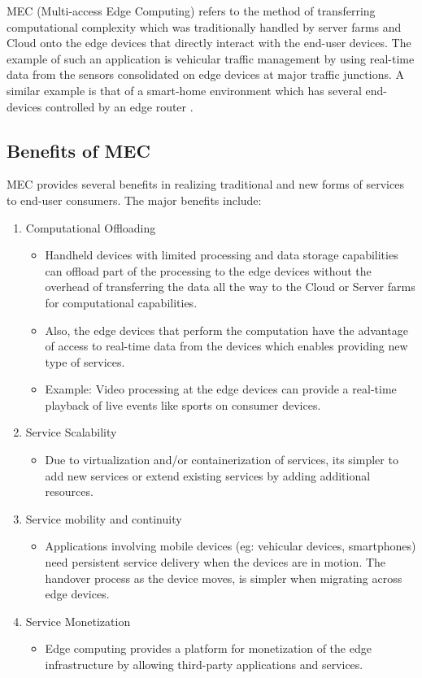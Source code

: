 MEC (Multi-access Edge Computing) refers to the method of transferring computational complexity which was traditionally handled by server farms and Cloud onto the edge devices that directly interact with the end-user devices. The example of such an application is vehicular traffic management by using real-time data from the sensors consolidated on edge devices at major traffic junctions. A similar example is that of a smart-home environment which has several end-devices controlled by an edge router \cite{etsimec}. 

\subsection{Benefits of MEC}
MEC provides several benefits in realizing traditional and new forms of services to end-user consumers. The major benefits include:

\begin{enumerate}
	\item Computational Offloading
	    \begin{itemize}
		\item Handheld devices with limited processing and data storage capabilities can offload part of the processing to the edge devices without the overhead of transferring the data all the way to the Cloud or Server farms for computational capabilities.
		\item Also, the edge devices that perform the computation have the advantage of access to real-time data from the devices which enables providing new type of services.
		\item Example: Video processing at the edge devices can provide a real-time playback of live events like sports on consumer devices. 
	    \end{itemize}
	\item Service Scalability
	    \begin{itemize}
		\item Due to virtualization and/or containerization of services, its simpler to add new services or extend existing services by adding additional resources.	 
	    \end{itemize}
        \item Service mobility and continuity
    	    \begin{itemize}
                \item Applications involving mobile devices (eg: vehicular devices, smartphones) need persistent service delivery when the devices are in motion. The handover process as the device moves, is simpler when migrating across edge devices.
            \end{itemize}
        \item Service Monetization
    	    \begin{itemize}
                \item Edge computing provides a platform for monetization of the edge infrastructure by allowing third-party applications and services.
            \end{itemize}
\end{enumerate}

